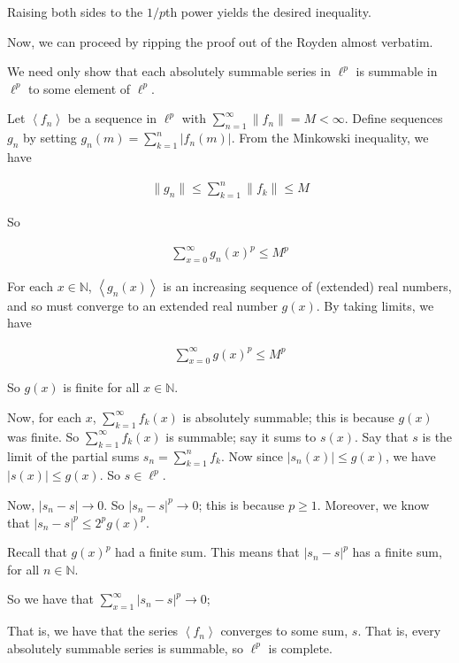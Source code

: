 \documentclass[a4paper,12pt]{article}
\newcommand{\tab}{\hspace{4mm}} %
\newcommand{\absval}[1]{\left\lvert #1 \right\rvert}
\newcommand{\norm}[1]{\|#1\|}
\newcommand{\anbrack}[1]{\left\langle #1 \right\rangle}
\newcommand{\N}{\mathbb{N}}
\begin{document}
\tab Raising both sides to the $1/p$th power yields the desired inequality. 

Now, we can proceed by ripping the proof out of the Royden almost verbatim.

\tab We need only show that each absolutely summable series in $\ell^p$ is summable in $\ell^p$ to some element of $\ell^p$.

\tab Let $\anbrack{f_n}$ be a sequence in $\ell^p$ with $\sum\limits_{n=1}^\infty \norm{f_n} = M < \infty$. Define sequences $g_n$ by setting $g_n(m) = \sum\limits_{k=1}^n \absval{f_n(m)}$. From the Minkowski inequality, we have

\begin{align*}
\norm{g_n} \leq \sum\limits_{k=1}^n \norm{f_k} \leq M
\end{align*}

So

\begin{align*}
\sum\limits_{x=0}^\infty g_n(x)^p \leq M^p
\end{align*}

For each $x \in \N$, $\anbrack{g_n(x)}$ is an increasing sequence of (extended) real numbers, and so must converge to an extended real number $g(x)$. By taking limits, we have

\begin{align*}
\sum\limits_{x=0}^\infty g(x)^p \leq M^p
\end{align*}

So $g(x)$ is finite for all $x \in \N$.

Now, for each $x$, $\sum\limits_{k=1}^\infty f_k(x)$ is absolutely summable; this is because $g(x)$ was finite. So $\sum\limits_{k=1}^\infty f_k(x)$ is summable; say it sums to $s(x)$. Say that $s$ is the limit of the partial sums $s_n = \sum\limits_{k=1}^n f_k$. Now since $\absval{s_n(x)} \leq g(x)$, we have $\absval{s(x)} \leq g(x)$. So $s \in \ell^p$.

Now, $\absval{s_n-s} \to 0$. So $\absval{s_n-s}^p \to 0$; this is because $p \geq 1$. Moreover, we know that $\absval{s_n-s}^p \leq 2^pg(x)^p$.

Recall that $g(x)^p$ had a finite sum. This means that $\absval{s_n-s}^p$ has a finite sum, for all $n \in \N$.

So we have that $\sum\limits_{x=1}^\infty \absval{s_n-s}^p \to 0$; %

That is, we have that the series $\anbrack{f_n}$ converges to some sum, $s$. That is, every absolutely summable series is summable, so $\ell^p$ is complete.
\end{document}
